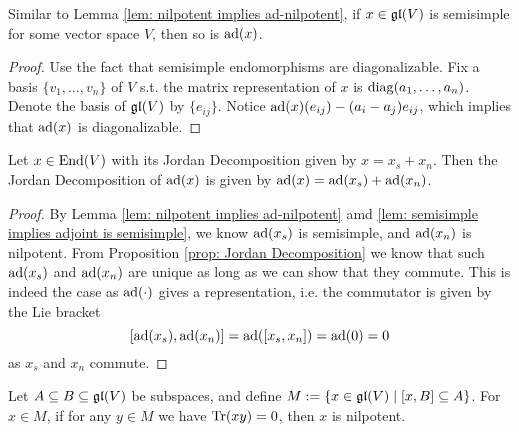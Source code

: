 \documentclass{article}
\begin{document}
\begin{lemma}\label{lem: semisimple implies adjoint is semisimple}
    Similar to Lemma \ref{lem: nilpotent implies ad-nilpotent}, if $x \in \mathfrak{gl}(V)$ is semisimple for some vector space $V$, then so is $\operatorname{ad}(x)$.
\end{lemma}

\begin{proof}
    Use the fact that semisimple endomorphisms are diagonalizable. Fix a basis $\{ v_1, \dots, v_n \}$ of $V$ s.t. the matrix representation of $x$ is $\operatorname{diag}( a_1, \dots, a_n )$. Denote the basis of $\mathfrak{gl}(V)$ by $\{ e_{ij} \}$. Notice $\operatorname{ad}(x)(e_{ij}) - (a_i - a_j) e_{ij}$, which implies that $\operatorname{ad}(x)$ is diagonalizable.
\end{proof}

\begin{lemma}
    Let $x \in \mathrm{End}(V)$ with its Jordan Decomposition given by $x = x_s + x_n$. Then the Jordan Decomposition of $\operatorname{ad}(x)$ is given by $\operatorname{ad}(x) = \operatorname{ad}(x_s) + \operatorname{ad}(x_n)$.
\end{lemma}

\begin{proof}
    By Lemma \ref{lem: nilpotent implies ad-nilpotent} amd \ref{lem: semisimple implies adjoint is semisimple}, we know $\operatorname{ad}(x_s)$ is semisimple, and $\operatorname{ad}(x_n)$ is nilpotent. From Proposition \ref{prop: Jordan Decomposition} we know that such $\operatorname{ad}(x_s)$ and $\operatorname{ad}(x_n)$ are unique as long as we can show that they commute. This is indeed the case as $\operatorname{ad}(\cdot)$ gives a representation, i.e. the commutator is given by the Lie bracket
    \[
        [\operatorname{ad}(x_s), \operatorname{ad}(x_n)] = \operatorname{ad}([x_s, x_n]) = \operatorname{ad}(0) = 0    
    \]
    as $x_s$ and $x_n$ commute.
\end{proof}

\begin{lemma}\label{lem: prep for Cartan's 1st Criterion}
    Let $A \subseteq B \subseteq \mathfrak{gl}(V)$ be subspaces, and define $M := \{ x \in \mathfrak{gl}(V) \mid [x, B] \subseteq A \}$. For $x \in M$, if for any $y \in M$ we have $\operatorname{Tr}(xy) = 0$, then $x$ is nilpotent.
\end{lemma}
\end{document}
